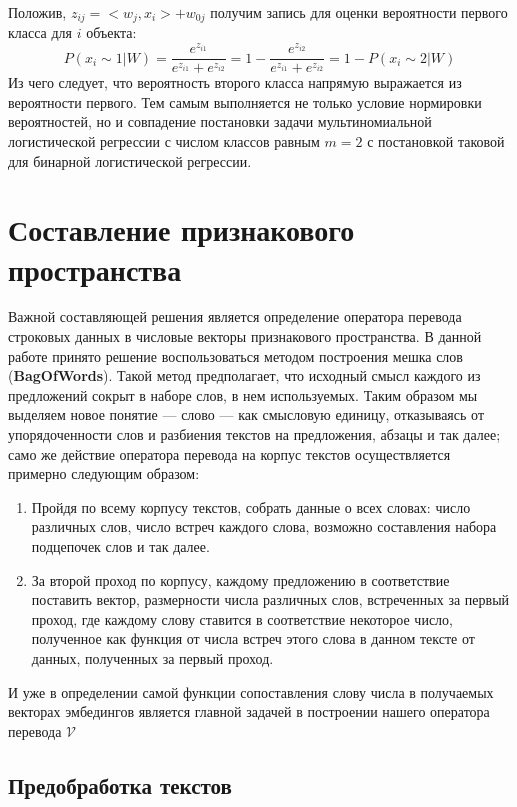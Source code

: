\documentclass{article}
\begin{document}
    Положив, $z_{ij}=<w_j, x_i> + w_{0j}$ получим запись для оценки вероятности первого класса для $i$ объекта: 
    $$P(x_i \sim 1 | W) = \frac{e^{z_{i1}}}{e^{z_{i1}} + e^{z_{i2}}} = 1 - \frac{e^{z_{i2}}}{e^{z_{i1}} + e^{z_{i2}}} = 1 - P(x_i \sim 2 | W)$$
    \noindent  Из чего следует, что вероятность второго класса напрямую выражается из вероятности первого. Тем самым выполняется не только условие нормировки вероятностей, но и совпадение постановки задачи мультиномиальной логистической регрессии с числом классов равным $m=2$ с постановкой таковой для бинарной логистической регрессии.

\section{Составление признакового пространства}
    Важной составляющей решения является определение оператора перевода строковых данных в числовые векторы признакового пространства. В данной работе принято решение воспользоваться методом построения мешка слов (\textbf{BagOfWords}). Такой метод предполагает, что исходный смысл каждого из предложений сокрыт в наборе слов, в нем используемых. Таким образом мы выделяем новое понятие — слово — как смысловую единицу, отказываясь от упорядоченности слов и разбиения текстов на предложения, абзацы и так далее; само же действие оператора перевода на корпус текстов осуществляется примерно следующим образом:

    \begin{enumerate}
        \item Пройдя по всему корпусу текстов, собрать данные о всех словах: число различных слов, число встреч каждого слова, возможно составления набора подцепочек слов и так далее.
        \item За второй проход по корпусу, каждому предложению в соответствие поставить вектор, размерности числа различных слов, встреченных за первый проход, где каждому слову ставится в соответствие некоторое число, полученное как функция от числа встреч этого слова в данном тексте от данных, полученных за первый проход.
    \end{enumerate}

    \noindent И уже в определении самой функции сопоставления слову числа в получаемых векторах эмбедингов является главной задачей в построении нашего оператора перевода $\mathcal{V}$

    \subsection{Предобработка текстов}
\end{document}
